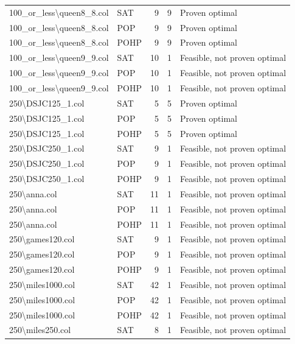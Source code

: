 \begin{longtable}{llrrl}
100\_or\_less\textbackslash{}queen8\_8.col & SAT & 9 & 9 & Proven optimal \\
100\_or\_less\textbackslash{}queen8\_8.col & POP & 9 & 9 & Proven optimal \\
100\_or\_less\textbackslash{}queen8\_8.col & POHP & 9 & 9 & Proven optimal \\
100\_or\_less\textbackslash{}queen9\_9.col & SAT & 10 & 1 & Feasible, not proven optimal \\
100\_or\_less\textbackslash{}queen9\_9.col & POP & 10 & 1 & Feasible, not proven optimal \\
100\_or\_less\textbackslash{}queen9\_9.col & POHP & 10 & 1 & Feasible, not proven optimal \\
250\textbackslash{}DSJC125\_1.col & SAT & 5 & 5 & Proven optimal \\
250\textbackslash{}DSJC125\_1.col & POP & 5 & 5 & Proven optimal \\
250\textbackslash{}DSJC125\_1.col & POHP & 5 & 5 & Proven optimal \\
250\textbackslash{}DSJC250\_1.col & SAT & 9 & 1 & Feasible, not proven optimal \\
250\textbackslash{}DSJC250\_1.col & POP & 9 & 1 & Feasible, not proven optimal \\
250\textbackslash{}DSJC250\_1.col & POHP & 9 & 1 & Feasible, not proven optimal \\
250\textbackslash{}anna.col & SAT & 11 & 1 & Feasible, not proven optimal \\
250\textbackslash{}anna.col & POP & 11 & 1 & Feasible, not proven optimal \\
250\textbackslash{}anna.col & POHP & 11 & 1 & Feasible, not proven optimal \\
250\textbackslash{}games120.col & SAT & 9 & 1 & Feasible, not proven optimal \\
250\textbackslash{}games120.col & POP & 9 & 1 & Feasible, not proven optimal \\
250\textbackslash{}games120.col & POHP & 9 & 1 & Feasible, not proven optimal \\
250\textbackslash{}miles1000.col & SAT & 42 & 1 & Feasible, not proven optimal \\
250\textbackslash{}miles1000.col & POP & 42 & 1 & Feasible, not proven optimal \\
250\textbackslash{}miles1000.col & POHP & 42 & 1 & Feasible, not proven optimal \\
250\textbackslash{}miles250.col & SAT & 8 & 1 & Feasible, not proven optimal \\

\end{longtable}
